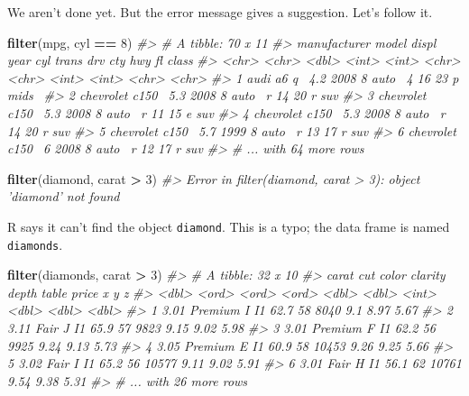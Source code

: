 \documentclass[]{book}
\newenvironment{Shaded}{\begin{snugshade}}{\end{snugshade}}
\newcommand{\CommentTok}[1]{\textcolor[rgb]{0.56,0.35,0.01}{\textit{#1}}}
\newcommand{\DecValTok}[1]{\textcolor[rgb]{0.00,0.00,0.81}{#1}}
\newcommand{\KeywordTok}[1]{\textcolor[rgb]{0.13,0.29,0.53}{\textbf{#1}}}
\newcommand{\NormalTok}[1]{#1}
\newcommand{\OperatorTok}[1]{\textcolor[rgb]{0.81,0.36,0.00}{\textbf{#1}}}
\newcommand{\StringTok}[1]{\textcolor[rgb]{0.31,0.60,0.02}{#1}}
\theoremstyle{plain}
\theoremstyle{remark}
\theoremstyle{definition}
\theoremstyle{definition}
\theoremstyle{definition}
\theoremstyle{remark}
\begin{document}
We aren't done yet. But the error message gives a suggestion. Let's
follow it.

\begin{Shaded}
\begin{Highlighting}[]
\KeywordTok{filter}\NormalTok{(mpg, cyl }\OperatorTok{==}\StringTok{ }\DecValTok{8}\NormalTok{)}
\CommentTok{#> # A tibble: 70 x 11}
\CommentTok{#>   manufacturer model displ  year   cyl trans drv     cty   hwy fl    class}
\CommentTok{#>   <chr>        <chr> <dbl> <int> <int> <chr> <chr> <int> <int> <chr> <chr>}
\CommentTok{#> 1 audi         a6 q~   4.2  2008     8 auto~ 4        16    23 p     mids~}
\CommentTok{#> 2 chevrolet    c150~   5.3  2008     8 auto~ r        14    20 r     suv  }
\CommentTok{#> 3 chevrolet    c150~   5.3  2008     8 auto~ r        11    15 e     suv  }
\CommentTok{#> 4 chevrolet    c150~   5.3  2008     8 auto~ r        14    20 r     suv  }
\CommentTok{#> 5 chevrolet    c150~   5.7  1999     8 auto~ r        13    17 r     suv  }
\CommentTok{#> 6 chevrolet    c150~   6    2008     8 auto~ r        12    17 r     suv  }
\CommentTok{#> # ... with 64 more rows}
\end{Highlighting}
\end{Shaded}

\begin{Shaded}
\begin{Highlighting}[]
\KeywordTok{filter}\NormalTok{(diamond, carat }\OperatorTok{>}\StringTok{ }\DecValTok{3}\NormalTok{)}
\CommentTok{#> Error in filter(diamond, carat > 3): object 'diamond' not found}
\end{Highlighting}
\end{Shaded}

R says it can't find the object \texttt{diamond}. This is a typo; the
data frame is named \texttt{diamonds}.

\begin{Shaded}
\begin{Highlighting}[]
\KeywordTok{filter}\NormalTok{(diamonds, carat }\OperatorTok{>}\StringTok{ }\DecValTok{3}\NormalTok{)}
\CommentTok{#> # A tibble: 32 x 10}
\CommentTok{#>   carat cut     color clarity depth table price     x     y     z}
\CommentTok{#>   <dbl> <ord>   <ord> <ord>   <dbl> <dbl> <int> <dbl> <dbl> <dbl>}
\CommentTok{#> 1  3.01 Premium I     I1       62.7    58  8040  9.1   8.97  5.67}
\CommentTok{#> 2  3.11 Fair    J     I1       65.9    57  9823  9.15  9.02  5.98}
\CommentTok{#> 3  3.01 Premium F     I1       62.2    56  9925  9.24  9.13  5.73}
\CommentTok{#> 4  3.05 Premium E     I1       60.9    58 10453  9.26  9.25  5.66}
\CommentTok{#> 5  3.02 Fair    I     I1       65.2    56 10577  9.11  9.02  5.91}
\CommentTok{#> 6  3.01 Fair    H     I1       56.1    62 10761  9.54  9.38  5.31}
\CommentTok{#> # ... with 26 more rows}
\end{Highlighting}
\end{Shaded}
\end{document}
